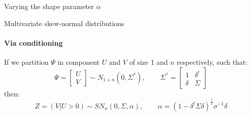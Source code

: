 \documentclass[presentation]{beamer}
\begin{document}
\begin{frame}{Varying the shape parameter $\alpha$}
\begin{figure}[h]
\center
{}
\label{fig:sn5}
\end{figure}
\end{frame}

\begin{frame}{Multivariate skew-normal distributions}
\framesubtitle{Via conditioning}
If we partition $\Psi$ in component $U$ and $V$ of size 1 and $n$ respectively, such that:
\begin{equation*}
	\Psi = \begin{bmatrix}
	U \\ V
	\end{bmatrix} \sim N_{1+n}(0,\Sigma^*), \hspace{25pt} \Sigma^* = \begin{bmatrix}
	1 & \delta^t \\
	\delta & \Sigma
	\end{bmatrix}
\end{equation*}
then:
\begin{equation*}
	Z = (V|U>0 )\sim SN_n(0,\Sigma, \alpha), \hspace{25pt} \alpha = (1-\delta^t \Sigma \delta)^\frac{1}{2} \sigma^{-1}\delta
\end{equation*}
\end{frame}
\end{document}

